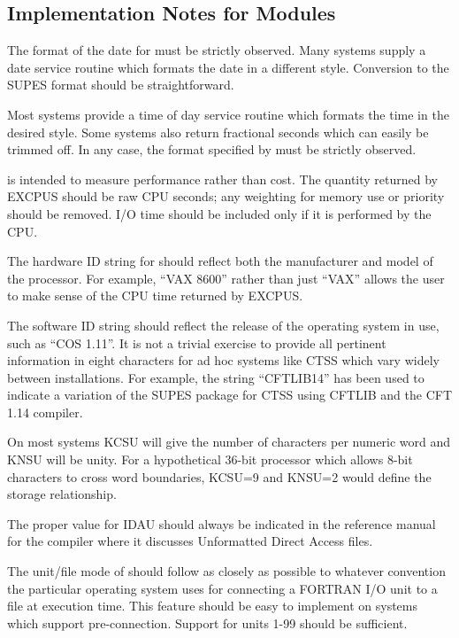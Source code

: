 \subsection{Implementation Notes for Modules}
The format of the date for  must be strictly observed.
Many systems supply a date service routine which formats the date in a
different style. Conversion to the SUPES format should be straightforward.

Most systems provide a time of day service routine which formats the time in
the desired style.  Some systems also return fractional seconds which can
easily be trimmed off.  In any case, the format specified by
 must be strictly observed.

 is intended to measure performance rather than cost.  The
quantity returned by EXCPUS should be raw CPU seconds; any weighting for
memory use or priority should be removed.  I/O time should be included only
if it is performed by the CPU.

The hardware ID string for  should reflect both the
manufacturer and model of the processor.  For example, ``VAX 8600'' rather
than just ``VAX'' allows the user to make sense of the CPU time returned by
EXCPUS.

The software ID string should reflect the release of the operating system in
use, such as ``COS 1.11''.  It is not a trivial exercise to provide all
pertinent information in eight characters for ad hoc systems like CTSS which
vary widely between installations.  For example, the string ``CFTLIB14'' has
been used to indicate a variation of the SUPES package for CTSS using CFTLIB
and the CFT 1.14 compiler.

On most systems KCSU will give the number of characters per numeric word and
KNSU will be unity.  For a hypothetical 36-bit processor which allows 8-bit
characters to cross word boundaries, KCSU=9 and KNSU=2 would define the
storage relationship.

The proper value for IDAU should always be indicated in the reference manual
for the compiler where it discusses Unformatted Direct Access files.

The unit/file mode of  should follow as closely as
possible to whatever convention the particular operating system uses for
connecting a FORTRAN I/O unit to a file at execution time.  This feature
should be easy to implement on systems which support pre-connection.  Support
for units 1-99 should be sufficient.

